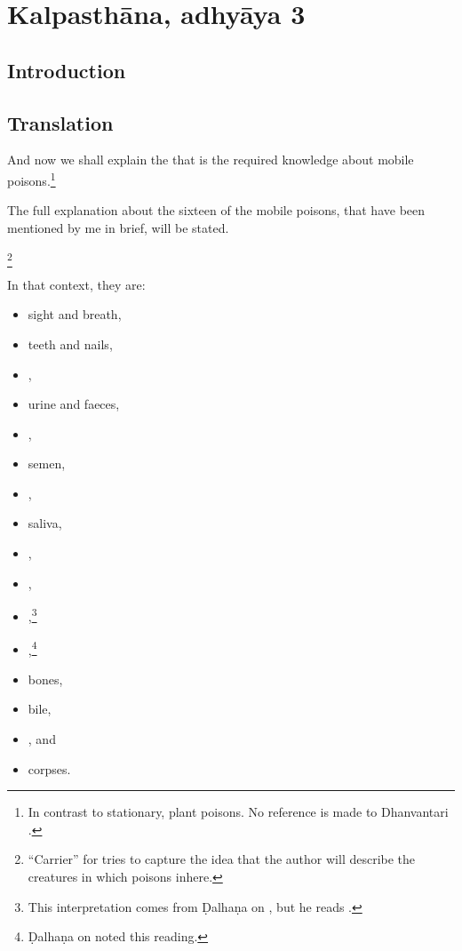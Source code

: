 \section{Kalpasthāna, adhyāya 3}

\subsection{Introduction}

\subsection{Translation}

\begin{translation}
    \item[1]
And now we shall explain the  that is the required knowledge about mobile
poisons.\footnote{In contrast to stationary, plant poisons.  No reference is made to 
Dhanvantari \citep[see][]{birc-2021}.}

\item[2] 

\item[3] 

The full explanation about the sixteen  of the mobile
poisons, that have been mentioned by me in brief, will be stated.


\footnote{ “Carrier” for  
 tries to capture the idea that the author will describe the creatures in which poisons inhere.} 
 
 \item[4]
 In that context, they are: 
 \begin{itemize}
     \item sight and breath,
     \item teeth and nails,
     \item {},
     \item  urine and faeces,
     \item {},
     \item semen,
     \item {},
     \item saliva,
     \item {},
     \item {},
     \item {},\footnote{This interpretation comes from
     Ḍalhaṇa on , but he reads .}
     \item {},\footnote{Ḍalhaṇa on  noted this reading.}
     \item bones,
     \item bile,
     \item {},
and 
     \item corpses.
     

\end{itemize}
\end{translation}
